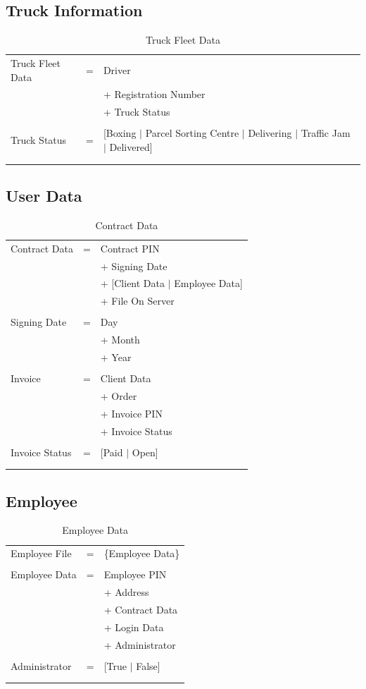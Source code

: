 \documentclass[11pt,a4paper,oneside,svgnames]{report}
\begin{document}
\subsection{Truck Information}
\label{sec:truckInfo}
\begin{longtable}{p{3.5cm}p{0.5cm}p{8.5cm}}
Truck Fleet Data & = & Driver\\
&  & + Registration Number\\
&  & + Truck Status \\
\\
Truck Status & = & [Boxing $|$ Parcel Sorting Centre $|$ Delivering $|$ Traffic Jam $|$ Delivered] \\
\hfill\\
\caption{Truck Fleet Data}\\
\end{longtable}

\subsection{User Data}
\begin{longtable}{p{3.5cm}p{0.5cm}p{8.5cm}}
Contract Data & = & Contract PIN\\
& & + Signing Date\\
& & + [Client Data $|$ Employee Data]\\
& & + File On Server\\
\\
Signing Date & = & Day\\
&  & + Month\\
&  & + Year\\
\\
Invoice & = & Client Data\\
&  & + Order\\
&  & + Invoice PIN\\
&  & + Invoice Status\\
\\
Invoice Status & = & [Paid $|$ Open]\\
\hfill\\
\caption{Contract Data}\\
\end{longtable}

\subsection{Employee}

\begin{longtable}{p{3.5cm}p{0.5cm}p{8.5cm}}
Employee File & = & \{Employee Data\}\\
\\
Employee Data & = & Employee PIN\\
&  & + Address\\
&  & + Contract Data\\
&  & + Login Data\\
&  & + Administrator\\
\\
Administrator & = & [True $|$ False]\\
\hfill\\
\caption{Employee Data}\\
\end{longtable}
\end{document}
